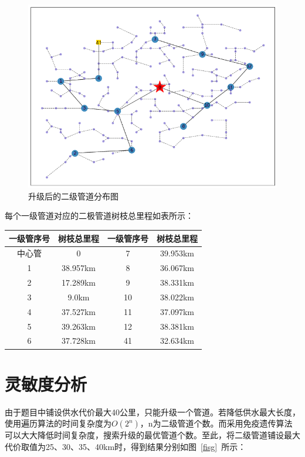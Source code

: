 \documentclass{whutmod}
\begin{document}
  	\begin{figure}[H]
  		\centering
  		\includegraphics[width=.7\textwidth]{figures/ssss.png}
  		\caption{升级后的二级管道分布图}\label{glsssd}
  	\end{figure}
  
  每个一级管道对应的二极管道树枝总里程如表所示：
  			\begin{table}[H]
  		\centering
  		\begin{tabular}{cccc}
  			\toprule[1.5pt]
  			\multicolumn{1}{m{3cm}}{\centering 一级管序号} & \multicolumn{1}{m{3cm}}{\centering 树枝总里程} &
  			\multicolumn{1}{m{3cm}}{\centering 一级管序号} &
  			\multicolumn{1}{m{3cm}}{\centering 树枝总里程} \\
  			\midrule[0.5pt]		
  			中心管 & 0 &7&39.953km \\ 
  			1  & 38.957km &8& 36.067km\\ 
  			2  & 17.289km &9& 38.331km\\ 
  		  	3  & 9.0km &10& 38.022km\\ 
  		  	4 & 37.527km &11&37.097km \\ 
  		  	5  & 39.263km &12& 38.381km\\ 
  		  	6  & 37.728km &41& 32.634km\\ 
  			\bottomrule[1.5pt]
  		\end{tabular}
  	\end{table}
  	
  	\section{灵敏度分析}
 	由于题目中铺设供水代价最大40公里，只能升级一个管道。若降低供水最大长度，使用遍历算法的时间复杂度为$O(2^n)$，n为二级管道个数。而采用免疫遗传算法可以大大降低时间复杂度，搜索升级的最优管道个数。至此，将二级管道铺设最大代价取值为25、30、35、40km时，得到结果分别如图~\ref{fisg}~所示：
 	
\end{document}
